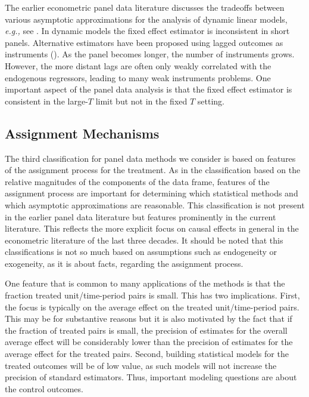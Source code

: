 \documentclass[letterpaper,12pt,leqno]{article}
\begin{document}
The earlier
econometric panel data literature discusses the tradeoffs between various asymptotic approximations for the analysis of dynamic linear models, \textit{e.g.,} see  \cite{hahn2002asymptotically,alvarez2003time}. In dynamic models the fixed effect estimator is inconsistent in short panels. Alternative estimators have been proposed using lagged outcomes as instruments (\cite{arellano1991some, blundell1998initial}). As the panel becomes longer, the number of instruments grows. However, the more distant lags are often only weakly correlated with the endogenous regressors, leading to many weak instruments problems. One important aspect of the panel data analysis is that the fixed effect estimator is consistent in the large-$T$ limit but not in the fixed $T$ setting.


\subsection{Assignment Mechanisms}


The third classification for panel data methods we consider is based on features of the assignment process for the treatment. As in the classification based on the relative magnitudes of the components of the data frame, features of the assignment process are important for determining which statistical methods and which asymptotic approximations are reasonable. This classification is not present in the earlier panel data literature but features prominently in the current literature. This reflects the more explicit focus on causal effects in general in the econometric literature of the last three decades. It should be noted that this classifications is not so much based on assumptions such as endogeneity or exogeneity, as it is about facts, regarding the assignment process.

One feature that is common to many applications of the methods is that the fraction treated unit/time-period pairs is small. This has two implications. First, the focus is typically on the average effect on the treated unit/time-period pairs. This may be for substantive reasons but it is also motivated by the fact that if the fraction of treated pairs is small, the precision of estimates for the overall average effect will be considerably lower than the precision of estimates for the average effect for the treated pairs.
Second, building statistical models for the treated outcomes will be of low value, as such models will not increase the precision of standard estimators. Thus, important modeling questions are about the control outcomes.
\end{document}
